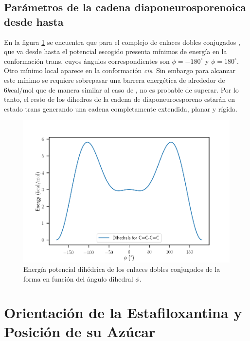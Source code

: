 \subsection*{Par\'{a}metros de la cadena diaponeurosporenoica desde  hasta }
En la figura \ref{fig:potdih} se encuentra que para el complejo de enlaces dobles conjugados , que va desde  hasta   el potencial escogido presenta m\'{i}nimos de energ\'{i}a en la conformaci\'{o}n trans, cuyos \'{a}ngulos correspondientes son $\phi=-180^{\circ}$ y $\phi=180^{\circ}$. Otro m\'{i}nimo local aparece en la conformaci\'{o}n \textit{cis}. Sin embargo para alcanzar este m\'{i}nimo se requiere sobrepasar una barrera energ\'{e}tica de alrededor  de $6k\mathrm{cal/mol}$ que de manera similar al caso de , no es probable de superar. Por lo tanto, el resto de los dihedros de la cadena de diaponeuroesporeno estar\'{a}n en estado trans generando una cadena completamente extendida, planar y r\'{i}gida.\\ 
\begin{figure}[h]
\begin{center}
    \includegraphics[scale=0.4]{Plots/Dihedrals for C=C-C=C.png}
  \caption{Energ\'{i}a potencial dih\'{e}drica de los enlaces dobles conjugados de la forma  en funci\'{o}n del \'{a}ngulo dihedral $\phi$.}
  \label{fig:potdih}
\end{center}
\end{figure}



\section{Orientaci\'{o}n de la Estafiloxantina y Posici\'{o}n de su Az\'{u}car}

